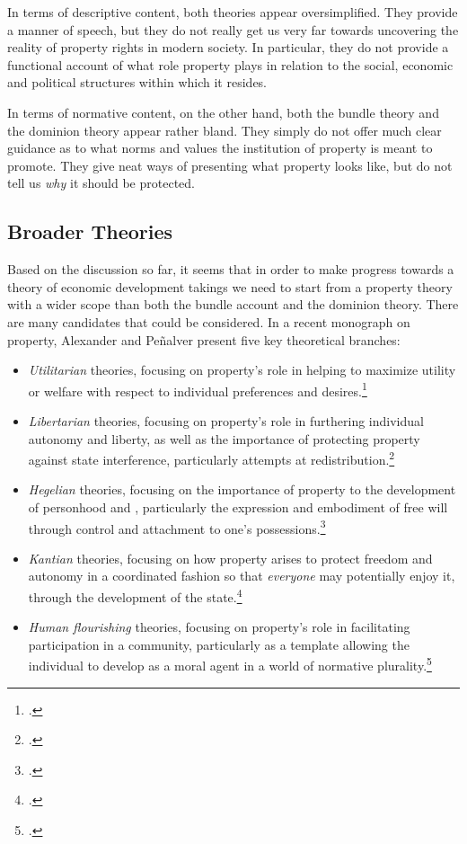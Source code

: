 In terms of descriptive content, both theories appear oversimplified. They provide a manner of speech, but they do not really get us very far towards uncovering the reality of property rights in modern society. In particular, they do not provide a functional account of what role property plays in relation to the social, economic and political structures within which it resides. 

In terms of normative content, on the other hand, both the bundle theory and the dominion theory appear rather bland. They simply do not offer much clear guidance as to what norms and values the institution of property is meant to promote. They give neat ways of presenting what property looks like, but do not tell us {\it why} it should be protected. 

\subsection{Broader Theories}

Based on the discussion so far, it seems that in order to make progress towards a theory of economic development takings we need to start from a property theory with a wider scope than both the bundle account and the dominion theory. There are many candidates that could be considered. In a recent monograph on property, Alexander and Pe\~{n}alver present five key theoretical branches:
\begin{itemize}
\item {\it Utilitarian} theories, focusing on property's role in helping to maximize utility or welfare with respect to individual preferences and desires.\footnote{\cite[Chapter 1]{alexander10}.} 
\item {\it Libertarian} theories, focusing on property's role in furthering individual autonomy and liberty, as well as the importance of protecting property against state interference, particularly attempts at redistribution.\footnote{\cite[Chapter 2]{alexander10}.} 
\item {\it Hegelian} theories, focusing on the importance of property to the development of personhood and , particularly the expression and embodiment of free will through control and attachment to one's possessions.\footnote{\cite[Chapter 3]{alexander10}.}
\item {\it Kantian} theories, focusing on how property arises to protect freedom and autonomy in a coordinated fashion so that {\it everyone} may potentially enjoy it, through the development of the state.\footnote{\cite[Chapter 4]{alexander10}.}
\item {\it  Human flourishing} theories, focusing on property's role in facilitating participation in a community, particularly as a template allowing the individual to develop as a moral agent in a world of normative plurality.\footnote{\cite[Chapter 5]{alexander10}.}
\end{itemize}

